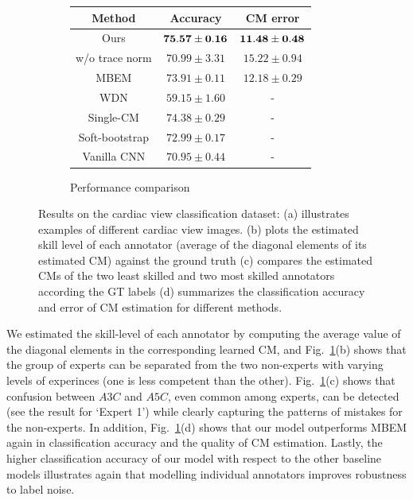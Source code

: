 \begin{figure}[h]
	\begin{subfigure}[]{0.55\linewidth}
		\vspace{3mm}
		\caption{Performance comparison}
		\begin{tabular}{|c|c c|} 
			\hline
			Method & Accuracy & CM error \\ 
			\hline
			Ours & $\bf{75.57\pm 0.16}$ &  $\bf{11.48 \pm 0.48}$ \\ 
			w/o trace norm & $70.99 \pm 3.31$ & $15.22 \pm0.94$  \\ 
			MBEM \cite{khetan2017learning} & $73.91\pm 0.11$ & $12.18\pm0.29$ \\ 
			WDN \cite{guan2017said} & $59.15 \pm 1.60$ & - \\ 
			Single-CM \cite{sukhbaatar2014training} & $74.38\pm0.29$ & - \\ 
			Soft-bootstrap \cite{reed2014training} & $72.99\pm 0.17$ & - \\ 
			Vanilla CNN & $70.95\pm 0.44$ & -\\ 
			\hline
		\end{tabular}
		
	\end{subfigure}
	\caption{\small Results on the cardiac view classification dataset: (a) illustrates examples of different cardiac view images. (b) plots the estimated skill level of each annotator (average of the diagonal elements of its estimated CM)  against the ground truth (c) compares the estimated CMs of the two least skilled and two most skilled annotators according the GT labels (d) summarizes the classification accuracy and error of CM estimation for different methods. }
	\label{fig:us_experiments}
\end{figure}

We estimated the skill-level of each annotator by computing the average value of the diagonal elements in the corresponding learned CM, and Fig.~\ref{fig:us_experiments}(b) shows that the group of experts can be separated from the two non-experts with varying levels of experinces (one is less competent than the other). Fig.~\ref{fig:us_experiments}(c) shows that confusion between $A3C$ and $A5C$, even common among experts, can be detected (see the result for `Expert 1') while clearly capturing the patterns of mistakes for the non-experts. In addition, Fig.~\ref{fig:us_experiments}(d) shows that our model outperforms MBEM \cite{khetan2017learning} again in classification accuracy and the quality of CM estimation. Lastly, the higher classification accuracy of our model with respect to the other baseline models illustrates again that modelling individual annotators improves robustness to label noise. 

